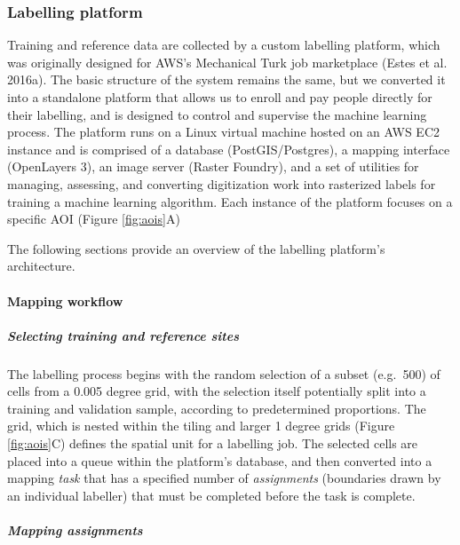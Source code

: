 \documentclass[11pt,a4paper]{article}
\begin{document}
\hypertarget{labelling-platform}{%
\subsubsection{Labelling platform}\label{labelling-platform}}

Training and reference data are collected by a custom labelling
platform, which was originally designed for AWS's Mechanical Turk job
marketplace (Estes et al. 2016a). The basic structure of the system
remains the same, but we converted it into a standalone platform that
allows us to enroll and pay people directly for their labelling, and is
designed to control and supervise the machine learning process. The
platform runs on a Linux virtual machine hosted on an AWS EC2 instance
and is comprised of a database (PostGIS/Postgres), a mapping interface
(OpenLayers 3), an image server (Raster Foundry), and a set of utilities
for managing, assessing, and converting digitization work into
rasterized labels for training a machine learning algorithm. Each
instance of the platform focuses on a specific AOI (Figure
\ref{fig:aois}A)

The following sections provide an overview of the labelling platform's
architecture.

\hypertarget{mapping-workflow}{%
\paragraph{Mapping workflow}\label{mapping-workflow}}

\hypertarget{selecting-training-and-reference-sites}{%
\subparagraph{Selecting training and reference
sites}\label{selecting-training-and-reference-sites}}

The labelling process begins with the random selection of a subset
(e.g.~500) of cells from a 0.005 degree grid, with the selection itself
potentially split into a training and validation sample, according to
predetermined proportions. The grid, which is nested within the tiling
and larger 1 degree grids (Figure \ref{fig:aois}C) defines the spatial
unit for a labelling job. The selected cells are placed into a queue
within the platform's database, and then converted into a mapping
\emph{task} that has a specified number of \emph{assignments}
(boundaries drawn by an individual labeller) that must be completed
before the task is complete.

\hypertarget{mapping-assignments}{%
\subparagraph{Mapping assignments}\label{mapping-assignments}}
\end{document}
